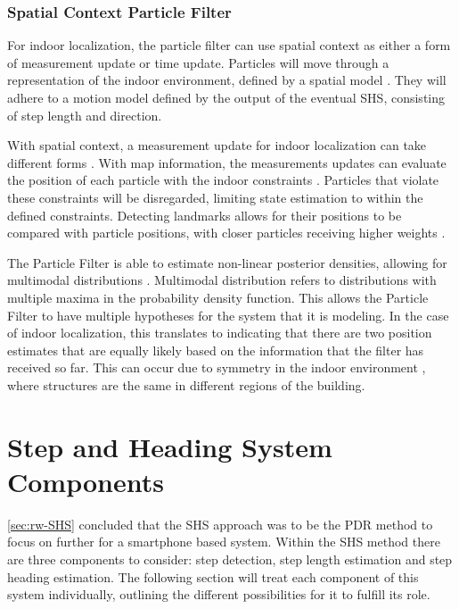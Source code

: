 \subsubsection{Spatial Context Particle Filter}
For indoor localization, the particle filter can use spatial context as either a form of measurement update or time update. Particles will move through a representation of the indoor environment, defined by a spatial model \cite{kihlberg2012map, Qian2015}. They will adhere to a motion model defined by the output of the eventual \ac{SHS}, consisting of step length and direction.\par 

With spatial context, a measurement update for indoor localization can take different forms \cite{Gu2019}. With map information, the measurements updates can evaluate the position of each particle with the indoor constraints \cite{Qian2015}. Particles that violate these constraints will be disregarded, limiting state estimation to within the defined constraints. Detecting landmarks allows for their positions to be compared with particle positions, with closer particles receiving higher weights \cite{Shang2015}.  \par 

The Particle Filter is able to estimate non-linear posterior densities, allowing for multimodal distributions \cite{gustafsson2010particle,kihlberg2012map}. Multimodal distribution refers to distributions with multiple maxima in the probability density function. This allows the Particle Filter to have multiple hypotheses for the system that it is modeling. In the case of indoor localization, this translates to indicating that there are two position estimates that are equally likely based on the information that the filter has received so far. This can occur due to symmetry in the indoor environment  \cite{Woodman2008}, where structures are the same in different regions of the building.


\newpage
\section{Step and Heading System Components}
\label{sec:shs_components}

\cref{sec:rw-SHS} concluded that the \acl{SHS} approach was to be the \ac{PDR} method to focus on further for a smartphone based system. Within the \ac{SHS} method there are three components to consider: step detection, step length estimation and step heading estimation. The following section will treat each component of this system individually, outlining the different possibilities for it to fulfill its role. \par 

